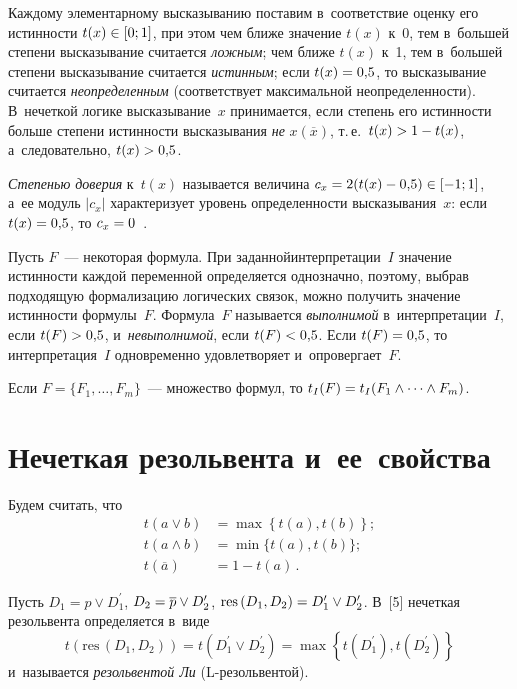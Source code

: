 \begin{multicols}{2}
  Каждому элементарному высказыванию   поставим в~соответствие оценку 
его истинности $t(x)\hm\in [0;1]$, при этом чем ближе значение $t(x)$ к~0, тем 
в~большей степени высказывание считается \textit{ложным}; чем ближе $t(x)$ 
к~1, тем в~большей степени высказывание считается \textit{истинным}; если 
$t(x)\hm=0{,}5$, то высказывание считается \textit{неопределенным} 
(соответствует максимальной неопределенности). В~нечеткой логике 
высказывание~$x$ принимается, если степень его истинности больше степени 
истинности высказывания \textit{не} $x (\overline{x})$, т.\,е.\ $t(x)\hm> 1\hm- 
t(x)$, а~следовательно, $t(x)\hm>0{,}5$.
  
  \textit{Степенью доверия} к~$t(x)$ называется величина $c_x\hm= 2(t(x)\hm-
0{,}5)\hm\in [-1;1]$, а~ее модуль $\vert c_x\vert$ характеризует уровень 
определенности высказывания~$x$: если $t(x)\hm=0{,}5$, то $c_x\hm= 
0$~\cite{6-les}.
  
  Пусть $F$~--- некоторая формула. При заданной\linebreak интерпретации~$I$ 
значение истинности каждой переменной определяется однозначно, поэтому, 
выбрав подходящую формализацию логических связок, можно получить 
значение истинности \mbox{формулы}~$F$. Формула~$F$ называется 
\textit{выполнимой} в~интерпретации~$I$, если $t(F)\hm> 0{,}5$, 
и~\textit{невыполнимой}, если $t(F)\hm< 0{,}5$. Если $t(F)\hm= 0{,}5$, то 
интерпретация~$I$ одновременно удовлетворяет и~опровергает~$F$.
  
  Если $F=\{F_1,\ldots , F_m\}$~--- множество формул, то $t_I(F)\hm= 
t_I(F_1\wedge \cdots\wedge F_m)$.

\vspace*{-6pt}

\section{Нечеткая резольвента и~ее~свойства}

  Будем считать, что
  \begin{align*}
  t(a\vee b) &=\max \left\{ t(a),t(b)\right\};\\
     t(a\wedge b) &=\min \{t(a),t(b)\};\\
  t\left( \overline{a}\right) &=1-t(a)\,.
  \end{align*}
  
  Пусть $D_1=p\vee D_1^\prime$, $D_2\hm= \overline{p}\vee D_2^\prime$, 
$\mathrm{res}\,(D_1,D_2) \hm= D_1^\prime \vee D_2^\prime$.
 В~[5] нечеткая резольвента 
определяется в~виде 
$$
t\left(\mathrm{res}\,(D_1,D_2) \right)= t\left( D_1^\prime \vee 
D_2^\prime\right) = \max \left\{ t(D_1^\prime), t(D_2^\prime)\right\}
$$ 
и~называется \textit{резольвентой Ли} (L-ре\-золь\-вен\-той).
  

\end{multicols}

